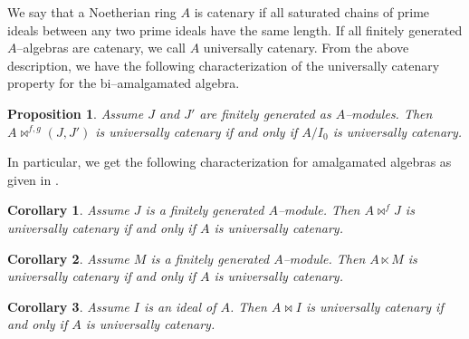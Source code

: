 \documentclass{amsart}%
\theoremstyle{plain}
\newtheorem{corollary}{Corollary}[section]
\newtheorem{proposition}{Proposition}[section]
\numberwithin{equation}{section}
\theoremstyle{definition}
\begin{document}
We say that a Noetherian ring $A$ is catenary if all saturated chains of prime ideals between any two prime ideals have the same length. If all finitely generated $A$--algebras are catenary, we call $A$ universally catenary. From the above description, we have the following characterization of the universally catenary property for the bi--amalgamated algebra.

\begin{proposition}\label{catenaryprop}
    Assume $J$ and $J'$ are finitely generated as $A$--modules. Then $A\bowtie^{f,g}(J,J')$ is universally catenary if and only if $A/I_0$ is universally catenary.
\end{proposition}
In particular, we get the following characterization for amalgamated algebras as given in \cite{iranlilar}.
\begin{corollary}
        Assume $J$ is a finitely generated $A$--module. Then $A\bowtie^{f}J$ is universally catenary if and only if $A$ is universally catenary.
\end{corollary}
\begin{corollary}
        Assume $M$ is a finitely generated $A$--module. Then $A\ltimes M$ is universally catenary if and only if $A$ is universally catenary.
\end{corollary}
\begin{corollary}
        Assume $I$ is an ideal of $A$. Then $A\bowtie I$ is universally catenary if and only if $A$ is universally catenary.
\end{corollary}
\end{document}
